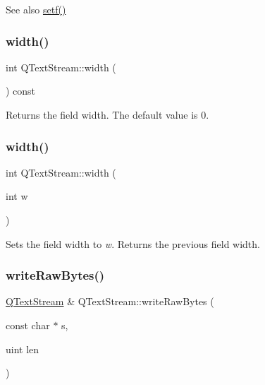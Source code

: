 \begin{DoxySeeAlso}{See also}
\mbox{\hyperlink{class_q_text_stream_adb71ee168e670b470bcbc547b994c5df}{setf()}} 
\end{DoxySeeAlso}
\mbox{\label{class_q_text_stream_a2ac246266f7cdeb3e14c2964c369fa86}} 
\subsubsection{\texorpdfstring{width()}{width()}\hspace{0.1cm}{\footnotesize\ttfamily [1/2]}}
{\footnotesize\ttfamily int Q\+Text\+Stream\+::width (\begin{DoxyParamCaption}{ }\end{DoxyParamCaption}) const\hspace{0.3cm}{\ttfamily [inline]}}

Returns the field width. The default value is 0. \mbox{\label{class_q_text_stream_a359d4bd2600d1169fb5c667e23c03f76}} 
\subsubsection{\texorpdfstring{width()}{width()}\hspace{0.1cm}{\footnotesize\ttfamily [2/2]}}
{\footnotesize\ttfamily int Q\+Text\+Stream\+::width (\begin{DoxyParamCaption}\item[{int}]{w }\end{DoxyParamCaption})\hspace{0.3cm}{\ttfamily [inline]}}

Sets the field width to {\itshape w}. Returns the previous field width. \mbox{\label{class_q_text_stream_ac92bd94165a60152f12905deed163189}} 
\subsubsection{\texorpdfstring{writeRawBytes()}{writeRawBytes()}}
{\footnotesize\ttfamily \mbox{\hyperlink{class_q_text_stream}{Q\+Text\+Stream}} \& Q\+Text\+Stream\+::write\+Raw\+Bytes (\begin{DoxyParamCaption}\item[{const char $\ast$}]{s,  }\item[{uint}]{len }\end{DoxyParamCaption})}

